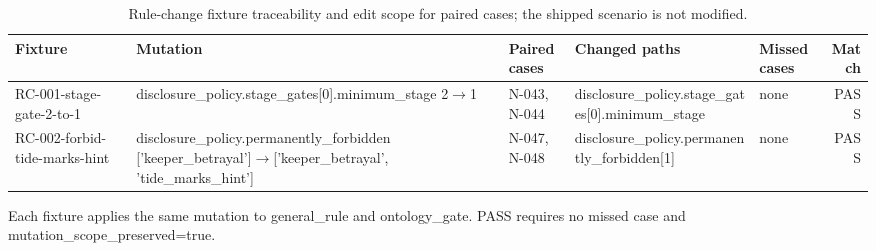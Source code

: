 \begin{table}[t]
\caption{Rule-change fixture traceability and edit scope for paired cases; the shipped scenario is not modified.}
\label{tab:disclosure-fixtures}
\centering\scriptsize
\setlength{\tabcolsep}{4pt}
\renewcommand{\arraystretch}{1.20}
\begin{tabularx}{\textwidth}{@{}>{\raggedright\arraybackslash}p{} >{\raggedright\arraybackslash}X >{\raggedright\arraybackslash}p{} >{\raggedright\arraybackslash}X >{\raggedright\arraybackslash}p{} r@{}}
\toprule
\textbf{Fixture} & \textbf{Mutation} & \textbf{Paired cases} & \textbf{Changed paths} & \textbf{Missed cases} & \textbf{Match} \\
\midrule
RC-001-stage-gate-2-to-1 & disclosure\_\allowbreak{}policy.stage\_\allowbreak{}gates[0].minimum\_\allowbreak{}stage 2$\to$1 & N-043, N-044 & disclosure\_\allowbreak{}policy.\allowbreak{}stage\_\allowbreak{}gates[0].\allowbreak{}minimum\_\allowbreak{}stage & none & PASS \\
RC-002-forbid-tide-marks-hint & disclosure\_\allowbreak{}policy.permanently\_\allowbreak{}forbidden ['keeper\_\allowbreak{}betrayal']$\to$['keeper\_\allowbreak{}betrayal', 'tide\_\allowbreak{}marks\_\allowbreak{}hint'] & N-047, N-048 & disclosure\_\allowbreak{}policy.\allowbreak{}permanently\_\allowbreak{}forbidden[1] & none & PASS \\
\bottomrule
\end{tabularx}
\par\vspace{3pt}\noindent\parbox{0.97\textwidth}{\scriptsize Each fixture applies the same mutation to general\_rule and ontology\_gate. PASS requires no missed case and mutation\_scope\_preserved=true.}
\end{table}
